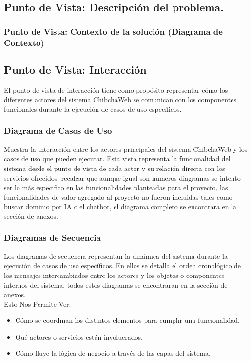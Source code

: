 \subsection{Punto de Vista: Descripción del problema.}

\subsubsection{Punto de Vista: Contexto de la solución (Diagrama de Contexto)}


\subsection{Punto de Vista: Interacción}
El punto de vista de interacción tiene como propósito representar cómo los diferentes actores del sistema ChibchaWeb se comunican con los componentes funcionales durante la ejecución de casos de uso específicos.

\subsubsection{Diagrama de Casos de Uso}

Muestra la interacción entre los actores principales del sistema ChibchaWeb y los casos de uso que pueden ejecutar. Esta vista representa la funcionalidad del sistema desde el punto de vista de cada actor y su relación directa con los servicios ofrecidos, recalcar que aunque igual son numeros diagramas se intento ser lo más especifico en las funcionalidades planteadas para el proyecto, las funcionalidades de valor agregado al proyecto no fueron incluidas tales como buscar dominio por IA o el chatbot, el diagrama completo se encontrara en la sección de anexos.

\subsubsection{Diagramas de Secuencia}

Los diagramas de secuencia representan la dinámica del sistema durante la ejecución de casos de uso específicos. En ellos se detalla el orden cronológico de los mensajes intercambiados entre los actores y los objetos o componentes internos del sistema, todos estos diagramas se encontraran en la sección de anexos.\\

Esto Nos Permite Ver:

\begin{itemize}
\item Cómo se coordinan los distintos elementos para cumplir una funcionalidad.

\item Qué actores o servicios están involucrados.

\item Cómo fluye la lógica de negocio a través de las capas del sistema.
\end{itemize}


